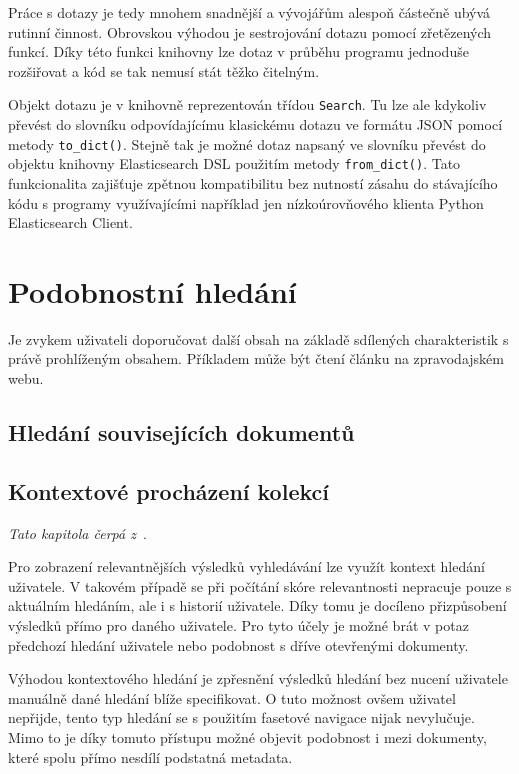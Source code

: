 Práce s dotazy je tedy mnohem snadnější a vývojářům alespoň částečně ubývá rutinní činnost. Obrovskou výhodou je sestrojování dotazu pomocí zřetězených funkcí. Díky této funkci knihovny lze dotaz v průběhu programu jednoduše rozšiřovat a kód se tak nemusí stát těžko čitelným.

Objekt dotazu je v knihovně reprezentován třídou \texttt{Search}. Tu lze ale kdykoliv převést do slovníku odpovídajícímu klasickému dotazu ve formátu JSON pomocí metody \texttt{to\_dict()}. Stejně tak je možné dotaz napsaný ve slovníku převést do objektu knihovny Elasticsearch DSL použitím metody \texttt{from\_dict()}. Tato funkcionalita zajišťuje zpětnou kompatibilitu bez nutností zásahu do stávajícího kódu s programy využívajícími například jen nízkoúrovňového klienta Python Elasticsearch Client.



\section{Podobnostní hledání}
Je zvykem uživateli doporučovat další obsah na základě sdílených charakteristik s právě prohlíženým obsahem. Příkladem může být čtení článku na zpravodajském webu.
\blindtext

\subsection{Hledání souvisejících dokumentů}
\blindtext[2]

\subsection{Kontextové procházení kolekcí}
\emph{Tato kapitola čerpá z~\cite{bib:similarity-context}}.



Pro zobrazení relevantnějších výsledků vyhledávání lze využít kontext hledání uživatele. V takovém případě se při počítání skóre relevantnosti nepracuje pouze s aktuálním hledáním, ale i s historií uživatele. Díky tomu je docíleno přizpůsobení výsledků přímo pro daného uživatele.
Pro tyto účely je možné brát v potaz předchozí hledání uživatele nebo podobnost s dříve otevřenými dokumenty.

Výhodou kontextového hledání je zpřesnění výsledků hledání bez nucení uživatele manuálně dané hledání blíže specifikovat. O tuto možnost ovšem uživatel nepřijde, tento typ hledání se s použitím fasetové navigace nijak nevylučuje. 
Mimo to je díky tomuto přístupu možné objevit podobnost i mezi dokumenty, které spolu přímo nesdílí podstatná metadata. 

